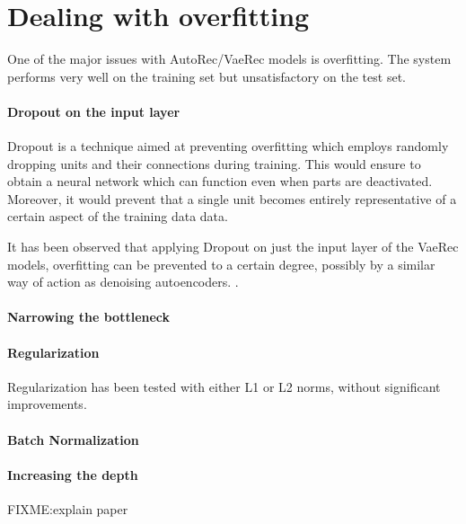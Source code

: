 \section{Dealing with overfitting}

One of the major issues with AutoRec/VaeRec models
is overfitting. The system performs very well on the training
set but unsatisfactory on the test set.

\paragraph{Dropout on the input layer}
Dropout \cite{Srivastava2014}
is a technique aimed at preventing overfitting
which employs randomly dropping units
and their connections
during training.
This would ensure to obtain a neural network
which can function even when parts are deactivated.
Moreover, it would prevent that a single unit becomes
entirely representative of a certain aspect of the training data
data.

It has been observed that applying Dropout on just the input layer
of the VaeRec models,
overfitting can be prevented to a certain degree,
possibly by a similar way of action as denoising autoencoders.
\cite{Vincent2010}.

\paragraph{Narrowing the bottleneck}
\paragraph{Regularization}
Regularization has been tested with either L1 or L2 norms,
without significant improvements.
\paragraph{Batch Normalization}
\paragraph{Increasing the depth}
FIXME:explain paper \cite{MhaskarLP17}
